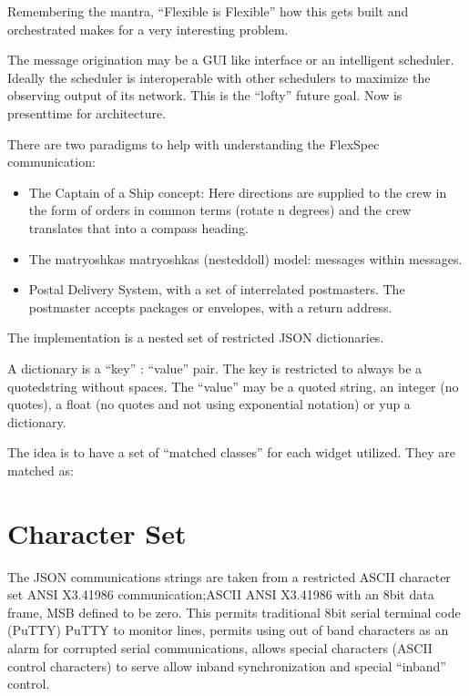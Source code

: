 \documentclass[letterpaper,10pt,english,openany,oneside]{sphinxmanual}
\begin{document}
\sphinxAtStartPar
Remembering the mantra, “Flexible is Flexible” \textendash{} how this gets built and
orchestrated makes for a very interesting problem.

\sphinxAtStartPar
The message origination may be a GUI like interface or an intelligent
scheduler. Ideally the scheduler is inter\sphinxhyphen{}operable with other schedulers
to maximize the observing output of its network. This is the “lofty” future goal.
Now is present\sphinxhyphen{}time for architecture.

\sphinxAtStartPar
There are two paradigms to help with understanding the FlexSpec
communication:
\begin{itemize}
\item {} 
\sphinxAtStartPar
The Captain of a Ship concept: Here directions are supplied to the crew in the form of orders in common terms (rotate n degrees) and the crew translates that into a compass heading.

\item {} 
\sphinxAtStartPar
The matryoshkas matryoshkas (nested\sphinxhyphen{}doll) model: messages within messages.

\item {} 
\sphinxAtStartPar
Postal Delivery System, with a set of inter\sphinxhyphen{}related postmasters. The postmaster accepts packages or envelopes, with a return address.

\end{itemize}

\sphinxAtStartPar
The implementation is a nested set of restricted JSON dictionaries.

\sphinxAtStartPar
A dictionary is a “key” : “value” pair. The key is restricted to always be a quoted\sphinxhyphen{}string
without spaces.  The “value” may be a quoted string, an integer (no quotes), a float
(no quotes and not using exponential notation) or \textendash{} yup a dictionary.

\sphinxAtStartPar
The idea is to have a set of “matched classes” for each widget utilized. They
are matched as:


\section{Character Set}
\label{\detokenize{communication:character-set}}
\sphinxAtStartPar
The JSON communications strings are taken from a restricted ASCII
character set ANSI X3.4\sphinxhyphen{}1986 communication;ASCII ANSI
X3.4\sphinxhyphen{}1986 with an 8\sphinxhyphen{}bit data frame, MSB defined to be zero. This
permits traditional 8\sphinxhyphen{}bit serial terminal code (PuTTY) PuTTY
to monitor lines, permits using out of band characters as an alarm
for corrupted serial communications, allows special characters
(ASCII control characters) to serve allow in\sphinxhyphen{}band synchronization
and special “in\sphinxhyphen{}band” control.
\end{document}
